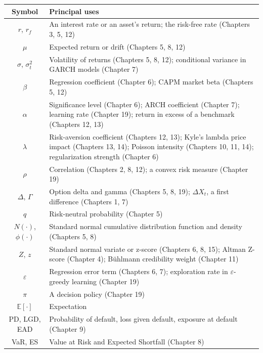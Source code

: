 \documentclass{book}
\begin{document}
\begin{center}
\begin{tabular}{cp{11.2cm}}
\toprule
Symbol & Principal uses \\
\midrule
$r$, $r_f$ & An interest rate or an asset's return; the risk-free rate (Chapters 3, 5, 12) \\
$\mu$ & Expected return or drift (Chapters 5, 8, 12) \\
$\sigma$, $\sigma_t^2$ & Volatility of returns (Chapters 5, 8, 12); conditional variance in GARCH models (Chapter 7) \\
$\beta$ & Regression coefficient (Chapter 6); CAPM market beta (Chapters 5, 12) \\
$\alpha$ & Significance level (Chapter 6); ARCH coefficient (Chapter 7); learning rate (Chapter 19); return in excess of a benchmark (Chapters 12, 13) \\
$\lambda$ & Risk-aversion coefficient (Chapters 12, 13); Kyle's lambda price impact (Chapters 13, 14); Poisson intensity (Chapters 10, 11, 14); regularization strength (Chapter 6) \\
$\rho$ & Correlation (Chapters 2, 8, 12); a convex risk measure (Chapter 19) \\
$\Delta$, $\Gamma$ & Option delta and gamma (Chapters 5, 8, 19); $\Delta X_t$, a first difference (Chapters 1, 7) \\
$q$ & Risk-neutral probability (Chapter 5) \\
$N(\cdot)$, $\phi(\cdot)$ & Standard normal cumulative distribution function and density (Chapters 5, 8) \\
$Z$, $z$ & Standard normal variate or z-score (Chapters 6, 8, 15); Altman Z-score (Chapter 4); B{\"u}hlmann credibility weight (Chapter 11) \\
$\varepsilon$ & Regression error term (Chapters 6, 7); exploration rate in $\varepsilon$-greedy learning (Chapter 19) \\
$\pi$ & A decision policy (Chapter 19) \\
$\mathbb{E}[\cdot]$ & Expectation \\
PD, LGD, EAD & Probability of default, loss given default, exposure at default (Chapter 9) \\
VaR, ES & Value at Risk and Expected Shortfall (Chapter 8) \\
\bottomrule
\end{tabular}
\end{center}

\mainmatter





















\end{document}
